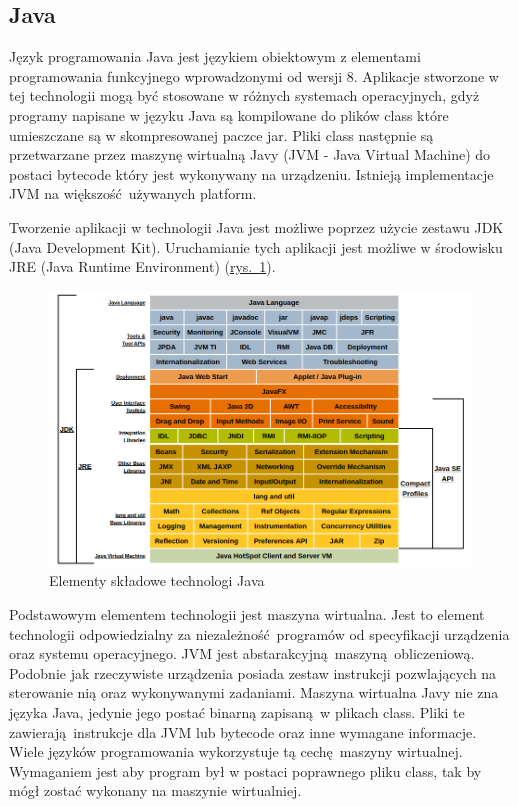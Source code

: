 \subsection{Java}
Język programowania Java jest językiem obiektowym z elementami programowania funkcyjnego wprowadzonymi od wersji 8. Aplikacje stworzone w tej technologii mogą być stosowane w różnych systemach operacyjnych, gdyż programy napisane w języku Java są kompilowane do plików class które umieszczane są w skompresowanej paczce jar. Pliki class następnie są przetwarzane przez maszynę wirtualną Javy (JVM - Java Virtual Machine) do postaci bytecode który jest wykonywany na urządzeniu. Istnieją implementacje JVM na większość używanych platform.

Tworzenie aplikacji w technologii Java jest możliwe poprzez użycie zestawu JDK (Java Development Kit). Uruchamianie tych aplikacji jest możliwe w środowisku JRE (Java Runtime Environment)  (\hyperref[fig:java_arch]{rys.~\ref*{fig:java_arch}}).

\begin{figure}[h]
  \center
  \includegraphics[scale=0.4]{../image/java_arch.png}
  \caption{Elementy składowe technologi Java \cite{OracleJavaArch}}
  \label{fig:java_arch}
\end{figure}

Podstawowym elementem technologii jest maszyna wirtualna. Jest to element technologii odpowiedzialny za niezależność programów od specyfikacji urządzenia oraz systemu operacyjnego. JVM jest abstarakcyjną maszyną obliczeniową. Podobnie jak rzeczywiste urządzenia posiada zestaw instrukcji pozwlających na sterowanie nią oraz wykonywanymi zadaniami. Maszyna wirtualna Javy nie zna języka Java, jedynie jego postać binarną zapisaną w plikach class. Pliki te zawierają instrukcje dla JVM lub bytecode oraz inne wymagane informacje. Wiele języków programowania wykorzystuje tą cechę maszyny wirtualnej. Wymaganiem jest aby program był w postaci poprawnego pliku class, tak by mógł zostać wykonany na maszynie wirtualniej.

